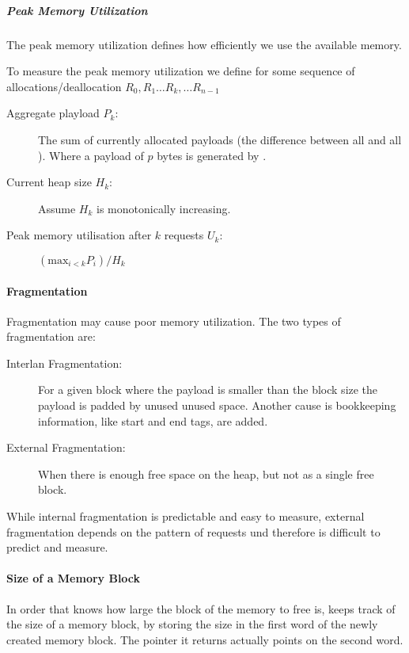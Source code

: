 \subparagraph{Peak Memory Utilization}
The peak memory utilization defines how efficiently we use the available memory.

To measure the peak memory utilization we define for some sequence of allocations/deallocation $R_0, R_1 \dots R_k, \dots R_{n-1}$

\begin{description}
    \item[Aggregate playload $P_k$:] The sum of currently allocated payloads (the difference between all  and all ). Where a payload of $p$ bytes is generated by .
    \item[Current heap size $H_k$:] Assume $H_k$ is monotonically increasing.
    \item[Peak memory utilisation after $k$ requests $U_k$:] $(\text{max}_{i<k} P_i) / H_k$ 
\end{description}

\paragraph{Fragmentation}
Fragmentation may cause poor memory utilization. The two types of fragmentation are:

\begin{description}
    \item[Interlan Fragmentation:] For a given block where the payload is smaller than the block size
        the payload is padded by unused unused space. Another cause is bookkeeping information, like start and end tags, are added.
    \item[External Fragmentation:] When there is enough free space on the heap, but not as a single free block.
\end{description}

While internal fragmentation is predictable and easy to measure, external fragmentation depends on the pattern of requests und therefore is difficult to predict and measure.

\paragraph{Size of a Memory Block}
In order that  knows how large the block of the memory to free is,  keeps track of the size of a memory block, by storing the size in the first word of the newly created memory block. The pointer it returns actually points on the second word.

